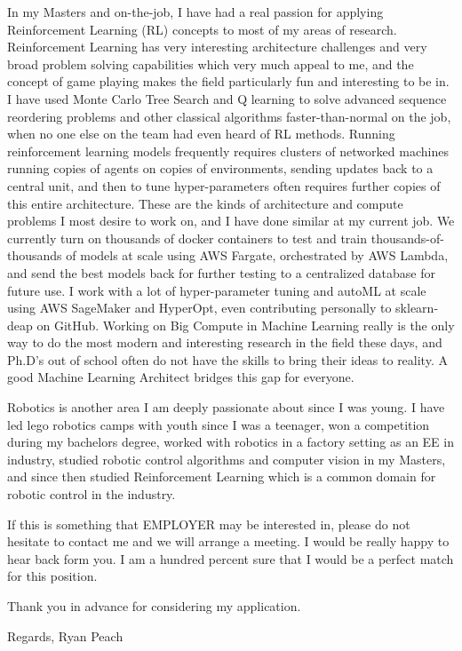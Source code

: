 In my Masters and on-the-job, I have had a real passion for applying Reinforcement Learning (RL) concepts to most of my areas of research. Reinforcement Learning has very interesting architecture challenges and very broad problem solving capabilities which very much appeal to me, and the concept of game playing makes the field particularly fun and interesting to be in. I have used Monte Carlo Tree Search and Q learning to solve advanced sequence reordering problems and other classical algorithms faster-than-normal on the job, when no one else on the team had even heard of RL methods. Running reinforcement learning models frequently requires clusters of networked machines running copies of agents on copies of environments, sending updates back to a central unit, and then to tune hyper-parameters often requires further copies of this entire architecture. These are the kinds of architecture and compute problems I most desire to work on, and I have done similar at my current job. We currently turn on thousands of docker containers to test and train thousands-of-thousands of models at scale using AWS Fargate, orchestrated by AWS Lambda, and send the best models back for further testing to a centralized database for future use. I work with a lot of hyper-parameter tuning and autoML at scale using AWS SageMaker and HyperOpt, even contributing personally to sklearn-deap on GitHub. Working on Big Compute in Machine Learning really is the only way to do the most modern and interesting research in the field these days, and Ph.D's out of school often do not have the skills to bring their ideas to reality. A good Machine Learning Architect bridges this gap for everyone.

Robotics is another area I am deeply passionate about since I was young. I have led lego robotics camps with youth since I was a teenager, won a competition during my bachelors degree, worked with robotics in a factory setting as an EE in industry, studied robotic control algorithms and computer vision in my Masters, and since then studied Reinforcement Learning which is a common domain for robotic control in the industry.
    
If this is something that {{ EMPLOYER }} may be interested in, please do not hesitate to contact me and we will arrange a meeting. I would be really happy to hear back form you. I am a hundred percent sure that I would be a perfect match for this position.

Thank you in advance for considering my application.

Regards,
Ryan Peach
